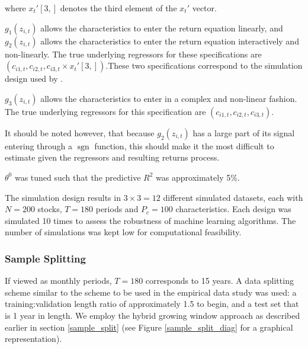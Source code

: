 \documentclass{article}
\begin{document}
where $x_{t}'[3,]$ denotes the third element of the $x_{t}'$ vector.

$g_1 \left(z_{i, t}\right)$ allows the characteristics to enter the return equation linearly, and $g_2 \left(z_{i, t}\right)$ allows the characteristics to enter the return equation interactively and non-linearly. The true underlying regressors for these specifications are $\left(c_{i 1, t}, c_{i 2, t}, c_{i 3, t} \times x_{t}'[3,]\right)$.These two specifications correspond to the simulation design used by \cite{gu_empirical_2018}. 

$g_3 \left(z_{i, t}\right)$ allows the characteristics to enter in a complex and non-linear fashion. The true underlying regressors for this specification are $\left(c_{i 1, t}, c_{i 2, t}, c_{i 3, t} \right)$. 

It should be noted however, that because $g_2 \left(z_{i, t}\right)$ has a large part of its signal entering through a $\operatorname{sgn}$ function, this should make it the most difficult to estimate given the regressors and resulting returns process.

$\theta^0$ was tuned such that the predictive $R^2$ was approximately 5\%.

The simulation design results in $3 \times 3 = 12$ different simulated datasets, each with $N = 200$ stocks, $T = 180$ periods and $P_c = 100$ characteristics. Each design was simulated 10 times to assess the robustness of machine learning algorithms. The number of simulations was kept low for computational feasibility.

\subsubsection{Sample Splitting}

If viewed as monthly periods, $T = 180$ corresponds to 15 years. A data splitting scheme similar to the scheme to be used in the empirical data study was used: a training:validation length ratio of approximately 1.5 to begin, and a test set that is 1 year in length. We employ the hybrid growing window approach as described earlier in section \ref{sample_split} (see Figure \ref{sample_split_diag} for a graphical representation).
\end{document}
